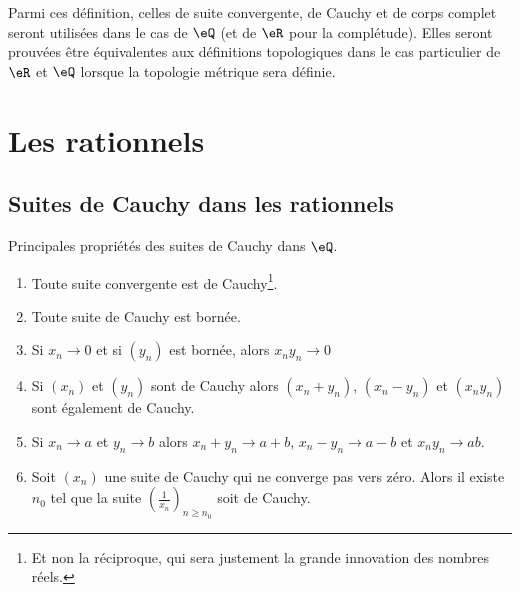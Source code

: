 Parmi ces définition, celles de suite convergente, de Cauchy et de corps complet seront utilisées dans le cas de \( \eQ\) (et de \( \eR\) pour la complétude). Elles seront prouvées être équivalentes aux définitions topologiques dans le cas particulier de \( \eR\) et \( \eQ\) lorsque la topologie métrique sera définie.

\section{Les rationnels}

\subsection{Suites de Cauchy dans les rationnels}

\begin{proposition}        \label{PropFFDJooAapQlP}
    Principales propriétés des suites de Cauchy dans \( \eQ\).
    \begin{enumerate}
        \item       \label{ItemRKCIooJguHdji}
            Toute suite convergente est de Cauchy\footnote{Et non la réciproque, qui sera justement la grande innovation des nombres réels.}.
        \item       \label{ItemRKCIooJguHdjii}
            Toute suite de Cauchy est bornée.
        \item       \label{ItemRKCIooJguHdjiii}
            Si \( x_n\to 0\) et si \( (y_n)\) est bornée, alors \( x_ny_n\to 0\)
        \item
            Si \( (x_n)\) et \( (y_n)\) sont de Cauchy alors \( (x_n+y_n)\), \( (x_n-y_n)\) et \( (x_ny_n)\) sont également de Cauchy.
        \item
            Si \( x_n\to a \) et \( y_n\to b \) alors \( x_n+y_n\to a+b\), \( x_n-y_n\to a-b\) et \(  x_ny_n\to ab  \).
        \item   \label{ItemRKCIooJguHdjvi}
            Soit \( (x_n)\) une suite de Cauchy qui ne converge pas vers zéro. Alors il existe \( n_0\) tel que la suite \( \left( \frac{1}{ x_n } \right)_{n\geq n_0}\) soit de Cauchy.
    \end{enumerate}
\end{proposition}

